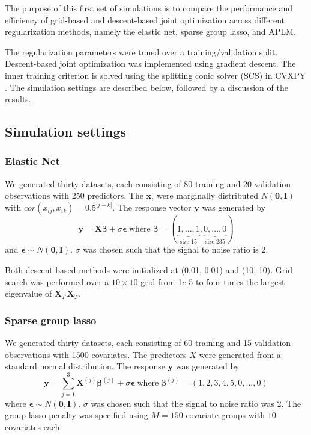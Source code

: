 \documentclass{statsoc}
\begin{document}
The purpose of this first set of simulations is to compare the performance and efficiency of grid-based and descent-based joint optimization across different regularization methods, namely the elastic net, sparse group lasso, and APLM.

The regularization parameters were tuned over a training/validation split. Descent-based joint optimization was implemented using gradient descent. The inner training criterion is solved using the splitting conic solver (SCS) in CVXPY \citep{cvxpy}. The simulation settings are described below, followed by a discussion of the results.

\subsection{Simulation settings}
\subsubsection{Elastic Net}
We generated thirty datasets, each consisting of 80 training and 20 validation observations with 250 predictors. The $\boldsymbol x_i$ were marginally distributed $N(\boldsymbol 0,\boldsymbol I)$ with $cor(x_{ij},x_{ik}) = 0.5^{|j-k|}$.
The response vector $\boldsymbol y$ was generated by
\begin{equation}
\boldsymbol y = \boldsymbol X \boldsymbol \beta + \sigma \boldsymbol \epsilon \; \text{where} \; \boldsymbol \beta = (\underbrace{1, ..., 1}_\text{size 15}, \underbrace{0, ..., 0}_\text{size 235})
\end{equation}
and $\boldsymbol \epsilon \sim N(\boldsymbol 0, \boldsymbol I)$. $\sigma$ was chosen such that the signal to noise ratio is 2. 

Both descent-based methods were initialized at (0.01, 0.01) and (10, 10). Grid search was performed over a $10 \times 10$ grid from 1$e$-5 to four times the largest eigenvalue of $\boldsymbol X_T^\top \boldsymbol X_T$.

\subsubsection{Sparse group lasso}\label{sec:simulation_sgl}
We generated thirty datasets, each consisting of 60 training and 15 validation observations with 1500 covariates. The predictors $X$ were generated from a standard normal distribution. The response $\boldsymbol y$ was generated by
\begin{equation}
\boldsymbol y = \sum\limits_{j=1}^3 \boldsymbol X^{(j)} \boldsymbol \beta^{(j)} + \sigma \boldsymbol \epsilon \; \text{where} \; \boldsymbol \beta^{(j)} = (1, 2, 3, 4, 5, 0, ..., 0)
\end{equation}
where $\boldsymbol \epsilon \sim N(\boldsymbol 0, \boldsymbol I)$. $\sigma$ was chosen such that the signal to noise ratio was 2. The group lasso penalty was specified using $M=150$ covariate groups with $10$ covariates each.
\end{document}
